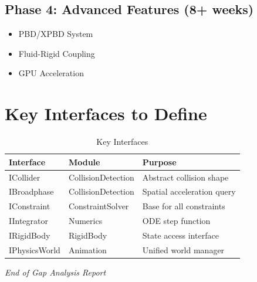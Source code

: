 \documentclass[11pt]{article}
\begin{document}
\subsection{Phase 4: Advanced Features (8+ weeks)}

\begin{itemize}
  \item PBD/XPBD System
  \item Fluid-Rigid Coupling
  \item GPU Acceleration
\end{itemize}

\section{Key Interfaces to Define}

\begin{table}[htbp]
\centering
\small
\caption{Key Interfaces}
\begin{tabularx}{\textwidth}{@{} p{3cm} p{3.5cm} X @{}}
\toprule
\textbf{Interface} & \textbf{Module} & \textbf{Purpose} \\
\midrule
ICollider & CollisionDetection & Abstract collision shape \\
IBroadphase & CollisionDetection & Spatial acceleration query \\
IConstraint & ConstraintSolver & Base for all constraints \\
IIntegrator & Numerics & ODE step function \\
IRigidBody & RigidBody & State access interface \\
IPhysicsWorld & Animation & Unified world manager \\
\bottomrule
\end{tabularx}
\end{table}

\begin{center}
\textit{End of Gap Analysis Report}
\end{center}
\end{document}
